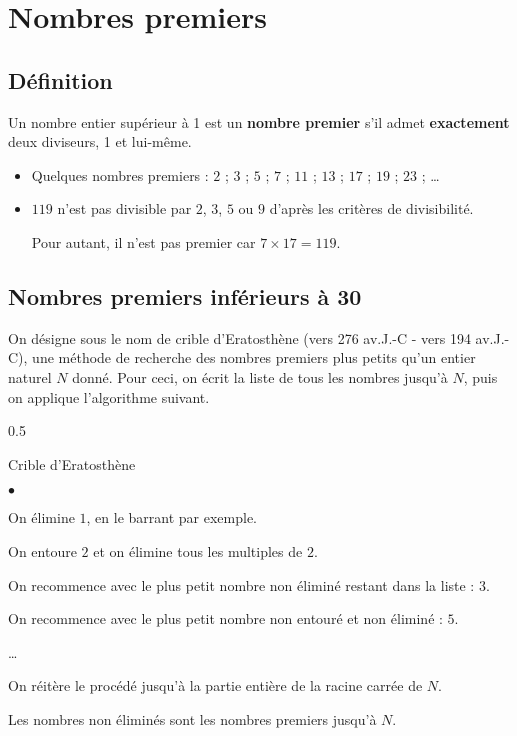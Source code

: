 \section{Nombres premiers}
\subsection{Définition}
\begin{definition}
	Un nombre entier supérieur à 1 est un \textbf{nombre premier} s'il admet \textbf{exactement} deux diviseurs, 1 et lui-même.
\end{definition}

\begin{remarque}
	\begin{itemize}
		\item Quelques nombres premiers : $2$ ; $3$ ; $5$ ; $7$ ; $11$ ; $13$ ; $17$ ; $19$ ; $23$ ; \ldots
		\item $119$ n'est pas divisible par $2$, $3$, $5$ ou $9$ d'après les critères de divisibilité.
		
		Pour autant, il n'est pas premier car $7\times 17 = 119$. 
	\end{itemize}
\end{remarque}	

\subsection{Nombres premiers inférieurs à 30}
	On désigne sous le nom de crible d'Eratosthène (vers 276 av.J.-C - vers 194 av.J.-C),
    une méthode de recherche des nombres premiers plus petits qu'un entier naturel $N$ donné.
    \smallskip
    Pour ceci, on écrit la liste de tous les nombres jusqu'à $N$, puis on applique l'algorithme suivant.
	\begin{spacing}{0.5}
    \begin{myBox}{Crible d'Eratosthène}		
        \begin{list}{$\bullet$}{}
            \item On élimine $1$, en le barrant par exemple.
            \item On entoure $2$ et on élimine tous les multiples de $2$.
            \item On recommence avec le plus petit nombre non éliminé restant dans la liste : $3$.
            \item On recommence avec le plus petit nombre non entouré et non éliminé : $5$.
            \item \dots
            \item On réitère le procédé jusqu'à la partie entière de la racine carrée de $N$.
        \end{list}
    \end{myBox}
	\end{spacing}
    Les nombres non éliminés sont les nombres premiers jusqu'à $N$.

